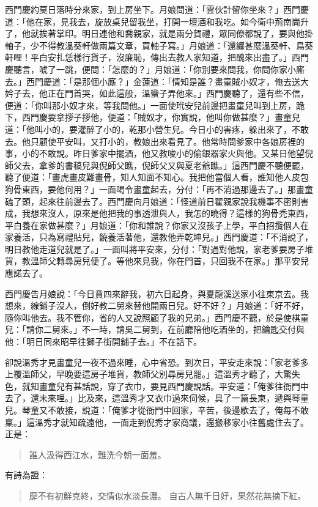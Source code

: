 西門慶約莫日落時分來家，到上房坐下。月娘問道：「雲伙計留你坐來？」西門慶道：「他在家，見我去，旋放桌兒留我坐，打開一壇酒和我吃。如今衛中荊南崗升了，他就挨著掌印。明日連他和喬親家，就是兩分賀禮，眾同僚都說了，要與他掛軸子，少不得教溫葵軒做兩篇文章，買軸子寫。」月娘道：「還纏甚麼溫葵軒、鳥葵軒哩！平白安扎恁樣行貨子，沒廉恥，傳出去教人家知道，把醜來出盡了。」西門慶聽言，唬了一跳，便問：「怎麼的？」月娘道：「你別要來問我，你問你家小廝去。」西門慶道：「是那個小廝？」金蓮道：「情知是誰？畫童賊小奴才，俺去送大妗子去，他正在門首哭，如此這般，溫蠻子弄他來。」西門慶聽了，還有些不信，便道：「你叫那小奴才來，等我問他。」一面使玳安兒前邊把畫童兒叫到上房，跪下，西門慶要拿拶子拶他，便道：「賊奴才，你實說，他叫你做甚麼？」畫童兒道：「他叫小的，要灌醉了小的，乾那小營生兒。今日小的害疼，躲出來了，不敢去。他只顧使平安叫，又打小的，教娘出來看見了。他常時問爹家中各娘房裡的事，小的不敢說。昨日爹家中擺酒，他又教唆小的偷銀器家火與他。又某日他望倪師父去，拿爹的書稿兒與倪師父瞧，倪師父又與夏老爺瞧。」這西門慶不聽便罷，聽了便道：「畫虎畫皮難畫骨，知人知面不知心。我把他當個人看，誰知他人皮包狗骨東西，要他何用？」一面喝令畫童起去，分付：「再不消過那邊去了。」那畫童磕了頭，起來往前邊去了。西門慶向月娘道：「怪道前日翟親家說我機事不密則害成，我想來沒人，原來是他把我的事透泄與人，我怎的曉得？這樣的狗骨禿東西，平白養在家做甚麼？」月娘道：「你和誰說？你家又沒孩子上學，平白招攬個人在家養活，只為寫禮貼兒，饒養活著他，還教他弄乾坤兒。」西門慶道：「不消說了，明日教他走道兒就是了。」一面叫將平安來，分付：「對過對他說，家老爹要房子堆貨，教溫師父轉尋房兒便了。等他來見我，你在門首，只回我不在家。」那平安兒應諾去了。

西門慶告月娘說：「今日賁四來辭我，初六日起身，與夏龍溪送家小往東京去。我想來，線鋪子沒人，倒好教二舅來替他開兩日兒。好不好？」月娘道：「好不好，隨你叫他去。我不管你，省的人又說照顧了我的兄弟。」西門慶不聽，於是使棋童兒：「請你二舅來。」不一時，請吳二舅到，在前廳陪他吃酒坐的，把鑰匙交付與他：「明日同來昭早往獅子街開鋪子去。」不在話下。

卻說溫秀才見畫童兒一夜不過來睡，心中省恐。到次日，平安走來說：「家老爹多上覆溫師父，早晚要這房子堆貨，教師父別尋房兒罷。」這溫秀才聽了，大驚失色，就知畫童兒有甚話說，穿了衣巾，要見西門慶說話。平安道：「俺爹往衙門中去了，還未來哩。」比及來，這溫秀才又衣巾過來伺候，具了一篇長柬，遞與琴童兒。琴童又不敢接，說道：「俺爹才從衙門中回家，辛苦，後邊歇去了，俺每不敢稟。」這溫秀才就知疏遠他，一面走到倪秀才家商議，還搬移家小往舊處住去了。正是：
\begin{quote}
誰人汲得西江水，難洗今朝一面羞。
\end{quote}
有詩為證：
\begin{quote}
靡不有初鮮克終，交情似水淡長濃。
自古人無千日好，果然花無摘下紅。
\end{quote}

